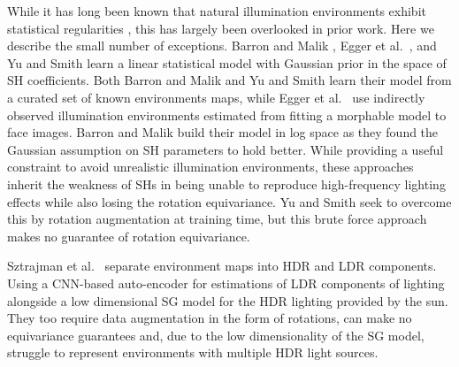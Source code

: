 While it has long been known that natural illumination environments exhibit statistical regularities \cite{dror_statistical_2004}, this has largely been overlooked in prior work. Here we describe the small number of exceptions. Barron and Malik \cite{barron2014shape}, Egger et al.~\cite{egger_occlusion-aware_2018}, and Yu and Smith \cite{yu_outdoor_2021} learn a linear statistical model with Gaussian prior in the space of SH coefficients. Both Barron and Malik \cite{barron2014shape} and Yu and Smith \cite{yu_outdoor_2021} learn their model from a curated set of known environments maps, while Egger et al.~\cite{egger_occlusion-aware_2018} use indirectly observed illumination environments estimated from fitting a morphable model to face images. Barron and Malik \cite{barron2014shape} build their model in log space as they found the Gaussian assumption on SH parameters to hold better. While providing a useful constraint to avoid unrealistic illumination environments, these approaches inherit the weakness of SHs in being unable to reproduce high-frequency lighting effects while also losing the rotation equivariance. Yu and Smith \cite{yu_outdoor_2021} seek to overcome this by rotation augmentation at training time, but this brute force approach makes no guarantee of rotation equivariance. 

Sztrajman et al.~\cite{sztrajman_high-dynamic-range_2020} separate environment maps into HDR and LDR components. Using a CNN-based auto-encoder for estimations of LDR components of lighting alongside a low dimensional SG model for the HDR lighting provided by the sun. They too require data augmentation in the form of rotations, can make no equivariance guarantees and, due to the low dimensionality of the SG model, struggle to represent environments with multiple HDR light sources.

